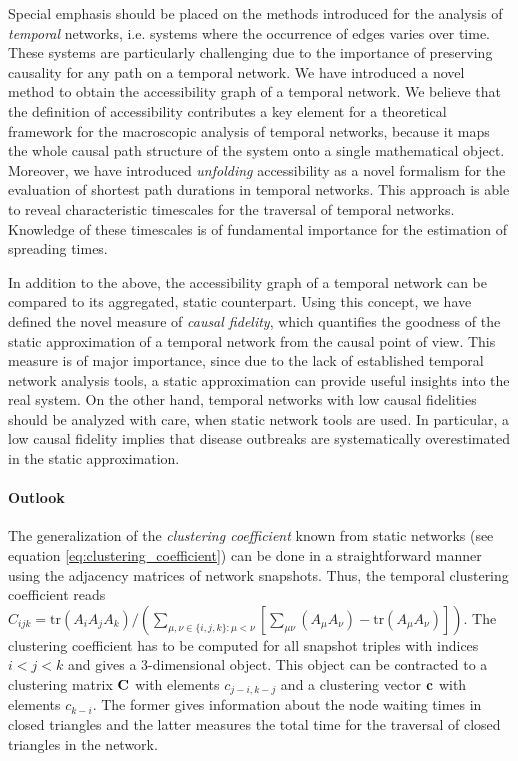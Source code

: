 Special emphasis should be placed on the methods introduced for the analysis of \emph{temporal} networks, i.e. systems where the occurrence of edges varies over time.
These systems are particularly challenging due to the importance of preserving causality for any path on a temporal network.
We have introduced a novel method to obtain the accessibility graph of a temporal network.
We believe that the definition of accessibility contributes a key element for a theoretical framework for the macroscopic analysis of temporal networks, because it maps the whole causal path structure of the system onto a single mathematical object.
Moreover, we have introduced \emph{unfolding} accessibility as a novel formalism for the evaluation of shortest path durations in temporal networks.
This approach is able to reveal characteristic timescales for the traversal of temporal networks.
Knowledge of these timescales is of fundamental importance for the estimation of spreading times.

In addition to the above, the accessibility graph of a temporal network can be compared to its aggregated, static counterpart.
Using this concept, we have defined the novel measure of \emph{causal fidelity}, which quantifies the goodness of the static approximation of a temporal network from the causal point of view.
This measure is of major importance, since due to the lack of established temporal network analysis tools, a static approximation can provide useful insights into the real system.
On the other hand, temporal networks with low causal fidelities should be analyzed with care, when static network tools are used.
In particular, a low causal fidelity implies that disease outbreaks are systematically overestimated in the static approximation.


\paragraph{Outlook\color{Cayenne}{.}}
The generalization of the \emph{clustering coefficient} known from static networks (see equation \eqref{eq:clustering_coefficient}) can be done in a straightforward manner using the adjacency matrices of network snapshots.
Thus, the temporal clustering coefficient reads $C_{ijk}=\text{tr} (A_{i}A_{j}A_{k})/( \sum_{\mu,\nu\in\{i,j,k\}:\mu<\nu}\left[\sum _{\mu \nu }\left(A_{\mu}A_{\nu}\right)-\text{tr}\left(A_{\mu}A_{\nu}\right)\right])$.
The clustering coefficient has to be computed for all snapshot triples with indices $i<j<k$ and gives a 3-dimensional object.
This object can be contracted to a clustering matrix $\mathbf{C}$ with elements $c_{j-i,k-j}$ and a clustering vector $\mathbf{c}$ with elements $c_{k-i}$.
The former gives information about the node waiting times in closed triangles and the latter measures the total time for the traversal of closed triangles in the network.


